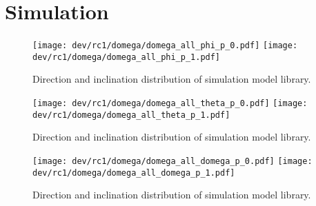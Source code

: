 % 
% 
\chapter{Simulation}
% 
\begin{figure}[p]
    \centering
    \texttt{[image: dev/rc1/domega/domega\_all\_phi\_p\_0.pdf]}
    \texttt{[image: dev/rc1/domega/domega\_all\_phi\_p\_1.pdf]}
    \caption[Boxplot]{Direction and inclination distribution of simulation model library. }
\end{figure}
% 
\begin{figure}[p]
    \centering
    \texttt{[image: dev/rc1/domega/domega\_all\_theta\_p\_0.pdf]}
    \texttt{[image: dev/rc1/domega/domega\_all\_theta\_p\_1.pdf]}
    \caption[Boxplot]{Direction and inclination distribution of simulation model library. }
\end{figure}
% 
\begin{figure}[p]
    \centering
    \texttt{[image: dev/rc1/domega/domega\_all\_domega\_p\_0.pdf]}
    \texttt{[image: dev/rc1/domega/domega\_all\_domega\_p\_1.pdf]}
    \caption[Boxplot]{Direction and inclination distribution of simulation model library. }
\end{figure}
% 